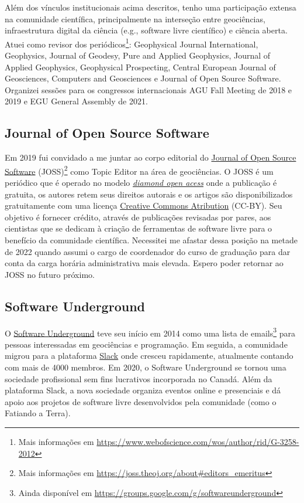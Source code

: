 \documentclass[12pt,a4paper,oneside]{book}
\newcommand{\ResearcherID}{G-3258-2012}
\begin{document}
Além dos vínculos institucionais acima descritos, tenho uma participação
extensa na comunidade científica, principalmente na interseção entre
geociências, infraestrutura digital da ciência (e.g., software livre
científico) e ciência aberta.
Atuei como revisor dos periódicos\footnote{Mais informações em \url{https://www.webofscience.com/wos/author/rid/\ResearcherID}}:
Geophysical Journal International,
Geophysics,
Journal of Geodesy,
Pure and Applied Geophysics,
Journal of Applied Geophysics,
Geophysical Prospecting,
Central European Journal of Geosciences,
Computers and Geosciences
e
Journal of Open Source Software.
Organizei sessões para os congressos internacionais AGU Fall Meeting de 2018 e
2019 e EGU General Assembly de 2021.

\subsection{Journal of Open Source Software}

Em 2019 fui convidado a me juntar ao corpo editorial do
\href{https://joss.theoj.org/}{Journal of Open Source Software}
(JOSS)\footnote{Mais informações em \url{https://joss.theoj.org/about\#editors\_emeritus}}
como Topic Editor na área de geociências.
O JOSS é um periódico que é operado no modelo
\href{https://en.wikipedia.org/wiki/Diamond_open_access}{\textit{diamond open acess}}
onde a publicação é gratuita, os autores retem seus direitos autorais e os
artigos são disponibilizados gratuitamente com uma licença
\href{https://creativecommons.org/licenses/by/4.0/}{Creative Commons Atribution} (CC-BY).
Seu objetivo é fornecer crédito, através de publicações revisadas por pares,
aos cientistas que se dedicam à criação de ferramentas de software livre para
o benefício da comunidade científica.
Necessitei me afastar dessa posição na metade de 2022 quando assumi o cargo
de coordenador do curso de graduação para dar conta da carga horária
administrativa mais elevada.
Espero poder retornar ao JOSS no futuro próximo.

\subsection{Software Underground}
\label{sec_swung}

O \href{https://softwareunderground.org/}{Software Underground} teve seu início
em 2014 como uma lista de
emails\footnote{Ainda disponível em \url{https://groups.google.com/g/softwareunderground}}
para pessoas interessadas em geociências e programação.
Em seguida, a comunidade migrou para a plataforma
\href{https://softwareunderground.org/slack}{Slack} onde cresceu rapidamente,
atualmente contando com mais de 4000 membros.
Em 2020, o Software Underground se tornou uma sociedade profissional sem fins
lucrativos incorporada no Canadá.
Além da plataforma Slack, a nova sociedade organiza eventos online e
presenciais e dá apoio aos projetos de software livre desenvolvidos pela
comunidade (como o Fatiando a Terra).
\end{document}
